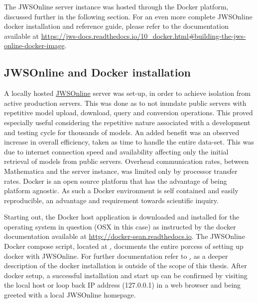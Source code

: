 The JWSOnline server instance was hosted through the Docker platform, discussed further in the following section. For an even more complete JWSOnline docker installation and reference guide, please refer to the documentation available at \href{https://jws-docs.readthedocs.io/10_docker.html#building-the-jws-online-docker-image}{https://jws-docs.readthedocs.io/10_docker.html#building-the-jws-online-docker-image}.

\subsection{JWSOnline and Docker installation} \label{Docker Installation}
A locally hosted \href{https://jjj.bio.vu.nl}{JWSOnline} server was set-up, in order to achieve isolation from active production servers. This was done as to not inundate public servers with repetitive model upload, download, query and conversion operations. This proved especially useful considering the repetitive nature associated with a development and testing cycle for thousands of models. An added benefit was an observed increase in overall efficiency, taken as time to handle the entire data-set. This was due to internet connection speed and availability affecting only the initial retrieval of models from public servers. Overhead communication rates, between Mathematica and the server instance, was limited only by processor transfer rates. 
Docker is an open source platform that has the advantage of being platform agnostic. As such a Docker environment is self contained and easily reproducible, an advantage and requirement towards scientific inquiry.

Starting out, the Docker host application is downloaded and installed for the operating system in question (OSX in this case) as instructed by the docker documentation available at \href{http://docker-sean.readthedocs.io}{http://docker-sean.readthedocs.io}. The JWSOnline Docker compose script, located at \href{http://jws-docs.readthedocs.io/10_docker.html#building-the-jws-online-docker-image}, documents the entire porcess of setting up docker with JWSOnline. For further documentation refer to \href{https://docs.docker.com/compose/compose-file/#compose-file-structure-and-examples}, as a deeper description of the docker installation is outside of the scope of this thesis. 
After docker setup, a successful installation and start up can be confirmed by visiting the local host or loop back IP address (127.0.0.1) in a web browser and being greeted with a local JWSOnline homepage.

